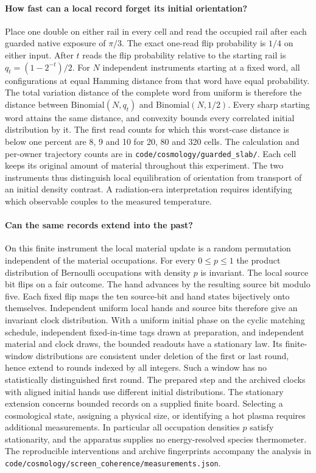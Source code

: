 \documentclass[11pt]{article}
\theoremstyle{remark}
\theoremstyle{plain}
\newcommand{\pathref}[1]{\nolinkurl{#1}}
\begin{document}
\paragraph{How fast can a local record forget its initial orientation?}
Place one double on either rail in every cell and read the occupied rail
after each guarded native exposure of \(\pi/3\). The exact one-read flip
probability is \(1/4\) on either input. After \(t\) reads the flip
probability relative to the starting rail is \(q_t=(1-2^{-t})/2\).
For \(N\) independent instruments starting at a fixed word, all configurations
at equal Hamming distance from that word have equal probability.
The total variation distance of the complete word from uniform is therefore
the distance between \(\mathrm{Binomial}(N,q_t)\) and
\(\mathrm{Binomial}(N,1/2)\). Every sharp starting word attains the same
distance, and convexity bounds every correlated initial distribution by it.
The first read counts for which this worst-case distance is below one
percent are 8, 9 and 10 for 20, 80 and 320 cells.
The calculation and per-owner trajectory counts are in
\pathref{code/cosmology/guarded_slab/}.
Each cell keeps its original amount of material throughout this experiment.
The two instruments thus distinguish local equilibration of orientation
from transport of an initial density contrast. A radiation-era interpretation
requires identifying which observable couples to the measured temperature.

\paragraph{Can the same records extend into the past?}
On this finite instrument the local material update is a random
permutation independent of the material occupations. For every
$0\le p\le 1$ the product distribution of Bernoulli occupations with
density $p$ is invariant. The local source bit flips on a fair outcome.
The hand advances by the resulting source bit modulo five. Each fixed
flip maps the ten source-bit and hand states bijectively onto themselves.
Independent uniform local hands and source bits therefore give an invariant
clock distribution. With a uniform initial phase on the cyclic matching
schedule, independent fixed-in-time tags drawn at preparation, and
independent material and clock draws, the bounded readouts have a stationary
law. Its finite-window distributions are consistent under deletion of the
first or last round, hence extend to rounds indexed by all integers.
Such a window has no statistically distinguished first round.
The prepared step and the archived clocks with aligned initial hands use
different initial distributions. The stationary extension concerns bounded
records on a supplied finite board. Selecting a cosmological state, assigning
a physical size, or identifying a hot plasma requires additional measurements.
In particular all occupation densities $p$ satisfy stationarity, and the
apparatus supplies no energy-resolved species thermometer. The reproducible
interventions and archive fingerprints accompany the analysis in
\pathref{code/cosmology/screen_coherence/measurements.json}.
\end{document}
